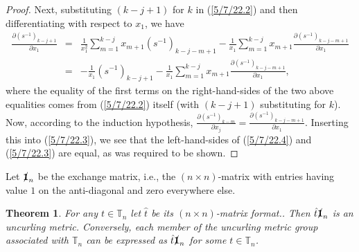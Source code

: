 \documentclass{amsart}
\numberwithin{equation}{section}
\newtheorem{theorem}{Theorem}
\theoremstyle{definition}
\numberwithin{theorem}{section}
\begin{document}
\begin{proof}
Next, substituting $(k-j+1)$ for $k$ in (\ref{5/7/22.2}) and then differentiating with respect to $x_1$, we have   \begin{eqnarray} \nonumber
 \frac{\partial \left( s^{-1} \right)_{k-j+1}}{\partial x_1} &=& \frac{1}{x_1^2} \sum_{m=1}^{k-j} x_{m+1} \left( s^{-1} \right)_{k-j-m+1}    - \frac{1}{x_1} \sum_{m=1}^{k-j} x_{m+1} \frac{\partial \left( s^{-1} \right)_{k-j-m+1}}{\partial x_1}  \\ &=& - \frac{1}{x_1}\left( s^{-1} \right)_{k-j+1}  -  \frac{1}{x_1} \sum_{m=1}^{k-j} x_{m+1} \frac{\partial \left( s^{-1} \right)_{k-j-m+1}}{\partial x_1},\label{5/7/22.3}\end{eqnarray} where the equality of the first terms on the right-hand-sides of the two above equalities comes from (\ref{5/7/22.2}) itself (with $(k-j+1)$ substituting for $k$). 
 Now, according to the induction hypothesis, $\frac{\partial \left( s^{-1} \right)_{k-m}}{\partial x_j} = \frac{\partial \left( s^{-1} \right)_{k-j-m+1}}{\partial x_1}$.  Inserting this into (\ref{5/7/22.3}), we see that the left-hand-sides of (\ref{5/7/22.4}) and (\ref{5/7/22.3}) are equal, as was required to be shown.
 \end{proof} 

Let $\slashed{\bf 1}_n$ be the exchange matrix, i.e., the $(n\times n)$-matrix with entries having value $1$ on the anti-diagonal and zero everywhere else.

\begin{theorem} \label{5/4/22.2} For any $t\in \mathbb{T}_n$ let $\hat{t}$ be its $(n\times n)$-matrix format..    Then $\hat{t} \slashed{\bf 1}_n$ is an uncurling metric.  Conversely, each member of the uncurling metric group associated with $\mathbb{T}_n$ can be expressed as $\hat{t}\slashed{\bf 1}_n$ for some $t\in \mathbb{T}_n$.   \end{theorem}
\end{document}
